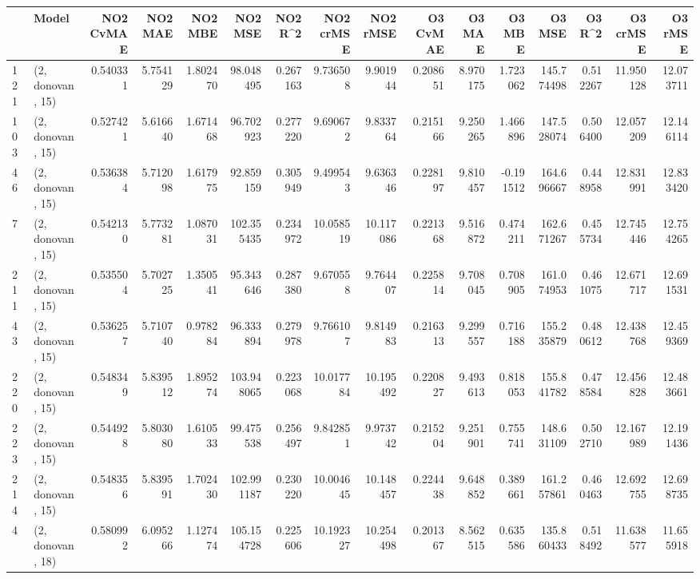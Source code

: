 \begin{tabular}{llrrrrrrrrrrrrrr}
\toprule
{} &             Model &  NO2 CvMAE &    NO2 MAE &   NO2 MBE &     NO2 MSE &   NO2 R\textasciicircum2 &  NO2 crMSE &   NO2 rMSE &  O3 CvMAE &     O3 MAE &     O3 MBE &      O3 MSE &    O3 R\textasciicircum2 &   O3 crMSE &    O3 rMSE \\
\midrule
121 &  (2, donovan, 15) &   0.540331 &   5.754129 &  1.802470 &   98.048495 &  0.267163 &   9.736508 &   9.901944 &  0.208651 &   8.970175 &   1.723062 &  145.774498 &  0.512267 &  11.950128 &  12.073711 \\
103 &  (2, donovan, 15) &   0.527421 &   5.616640 &  1.671468 &   96.702923 &  0.277220 &   9.690672 &   9.833764 &  0.215166 &   9.250265 &   1.466896 &  147.528074 &  0.506400 &  12.057209 &  12.146114 \\
46  &  (2, donovan, 15) &   0.536384 &   5.712098 &  1.617975 &   92.859159 &  0.305949 &   9.499543 &   9.636346 &  0.228197 &   9.810457 &  -0.191512 &  164.696667 &  0.448958 &  12.831991 &  12.833420 \\
7   &  (2, donovan, 15) &   0.542130 &   5.773281 &  1.087031 &  102.355435 &  0.234972 &  10.058519 &  10.117086 &  0.221368 &   9.516872 &   0.474211 &  162.671267 &  0.455734 &  12.745446 &  12.754265 \\
211 &  (2, donovan, 15) &   0.535504 &   5.702725 &  1.350541 &   95.343646 &  0.287380 &   9.670558 &   9.764407 &  0.225814 &   9.708045 &   0.708905 &  161.074953 &  0.461075 &  12.671717 &  12.691531 \\
43  &  (2, donovan, 15) &   0.536257 &   5.710740 &  0.978284 &   96.333894 &  0.279978 &   9.766107 &   9.814983 &  0.216313 &   9.299557 &   0.716188 &  155.235879 &  0.480612 &  12.438768 &  12.459369 \\
220 &  (2, donovan, 15) &   0.548349 &   5.839512 &  1.895274 &  103.948065 &  0.223068 &  10.017784 &  10.195492 &  0.220827 &   9.493613 &   0.818053 &  155.841782 &  0.478584 &  12.456828 &  12.483661 \\
223 &  (2, donovan, 15) &   0.544928 &   5.803080 &  1.610533 &   99.475538 &  0.256497 &   9.842851 &   9.973742 &  0.215204 &   9.251901 &   0.755741 &  148.631109 &  0.502710 &  12.167989 &  12.191436 \\
214 &  (2, donovan, 15) &   0.548356 &   5.839591 &  1.702430 &  102.991187 &  0.230220 &  10.004645 &  10.148457 &  0.224438 &   9.648852 &   0.389661 &  161.257861 &  0.460463 &  12.692755 &  12.698735 \\
4   &  (2, donovan, 18) &   0.580992 &   6.095266 &  1.127474 &  105.154728 &  0.225606 &  10.192327 &  10.254498 &  0.201367 &   8.562515 &   0.635586 &  135.860433 &  0.518492 &  11.638577 &  11.655918 \\

\end{tabular}
